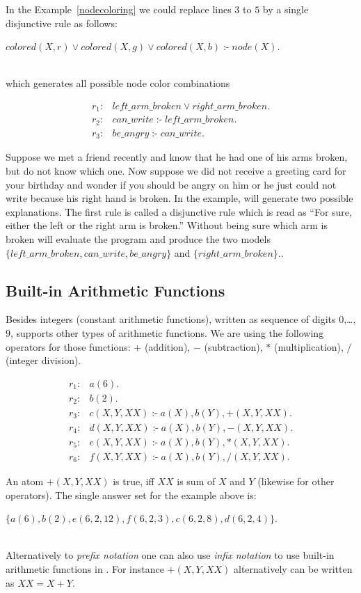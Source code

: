 \documentclass[a4paper, titlepage]{article}
\DeclareMathOperator{\leftimpl}{:-}
\begin{document}
In the Example~\ref{nodecoloring} we could replace lines $3$ to $5$ by a single disjunctive rule as follows:\\
\centerline{$\mathit{colored(X,r)} \vee \mathit{colored(X,g)} \vee \mathit{colored(X,b)} \leftimpl \mathit{node(X).}$} 
\\which generates all possible node color combinations 
\begin{exmp}
\begin{align*}
r_1\colon& \mathit{left\_arm\_broken} \vee 
\mathit{right\_arm\_broken}.\\
r_2\colon& \mathit{can\_write} \leftimpl 
\mathit{left\_arm\_broken}.\\
r_3\colon& \mathit{be\_angry} \leftimpl 
\mathit{can\_write}.
\end{align*}
\end{exmp}
Suppose we met a friend recently and know that he had one 
of his arms broken, but do not know which one. Now suppose 
we did not receive a greeting card for your birthday and 
wonder if you should be angry on him or he just could not 
write because his right hand is broken. In the example, 
\dlvhex{} will generate two possible explanations. The 
first rule is called a disjunctive rule which is read as 
\enquote{For sure, either the left or the right arm is broken.} Without being sure which arm is broken \dlvhex{} 
will evaluate the program and produce the two models 
$\mathit{\{left\_arm\_broken, can\_write, be\_angry\}}$ and 
$\mathit{\{right\_arm\_broken\}}$..

\subsection{Built-in Arithmetic Functions}
Besides integers (constant arithmetic functions), written 
as sequence of digits $0$,\dots,$9$, \dlvhex{} supports 
other types of arithmetic functions. We are using the 
following operators for those functions: $+$ (addition), 
$-$ (subtraction), $*$ (multiplication), $/$ (integer 
division). 
\begin{exmp}
\begin{align*}
r_1\colon& \mathit{a}(6). \\
r_2\colon& \mathit{b}(2). \\
r_3\colon& c(X,Y,XX) \leftimpl a(X), b(Y),+(X, Y, XX). \\
r_4\colon& d(X,Y,XX) \leftimpl a(X), b(Y),-(X, Y, XX). \\
r_5\colon& e(X,Y,XX) \leftimpl a(X), b(Y),*(X, Y, XX). \\
r_6\colon& f(X,Y,XX) \leftimpl a(X), b(Y),/(X, Y, XX).
\end{align*}
\end{exmp}
An atom $+(X,Y,XX)$ is true, iff $XX$ is sum of $X$ and $Y$ (likewise for other operators).
The single answer set for the example above is:\\ 
\centerline{$\mathit{\{a(6),b(2),e(6,2,12),f(6,2,3),c(6,2,8),d(6,2,4)\}}$.}
\\Alternatively to \emph{prefix notation} one can also use 
\emph{infix notation} to use built-in arithmetic functions 
in \dlvhex{}. For instance $\mathit{+(X, Y, XX)}$ 
alternatively can be written as $\mathit{XX=X+Y}$. 
\end{document}
